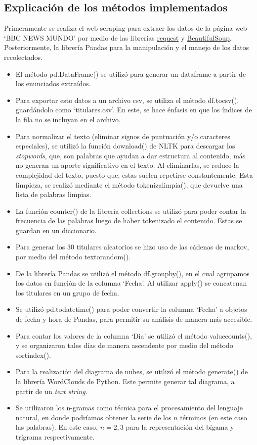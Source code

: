 \subsection{Explicación de los métodos implementados}
Primeramente se realiza el web scraping para extraer los datos de la página web ‘BBC NEWS MUNDO’ por medio de las librerías \underline{request} y \underline{BeautifulSoup}. Posteriormente, la librería Pandas para la manipulación y el manejo de los datos recolectados. 
\begin{itemize}
    \item El método pd.DataFrame() se utilizó para generar un dataframe a partir de los enunciados extraídos.  
    \item Para exportar esto datos a un archivo csv, se utiliza el método df.to\textunderscore csv(), guardándolo como ‘titulares.csv’. En este, se hace énfasis en que los índices de la fila no se incluyan en el archivo. 
    \item Para normalizar el texto (eliminar signos de puntuación y/o caracteres especiales), se utilizó la función download() de     NLTK para descargar los \textit{stopwords}, que, son palabras que ayudan a dar estructura al contenido, más no generan un aporte significativo en el texto. Al eliminarlas, se reduce la complejidad del texto, puesto que, estas suelen repetirse constantemente. Esta limpieza, se realizó mediante el método tokeniza\textunderscore limpia(), que devuelve una lista de palabras limpias.
    \item La función counter() de la librería collections se utilizó para poder contar la frecuencia de las palabras luego de haber tokenizado el contenido. Estas se guardan en un diccionario. 
    \item Para generar los 30 titulares aleatorios se hizo uso de las cádenas de markov, por medio del método texto\textunderscore random().
    \item De la librería Pandas se utilizó el método df.groupby(), en el cual agrupamos los datos en función de la columna ‘Fecha’. Al utilizar apply() se concatenan los titulares en un grupo de fecha. 
    \item Se utilizó pd.to\textunderscore datetime() para poder convertir la columna ‘Fecha’ a objetos de fecha y hora de Pandas, para permitir su análisis de manera más accesible. 
    \item Para contar los valores de la columna ‘Dia’ se utilizó el método value\textunderscore counts(), y se organizaron tales días de manera ascendente por medio del método sort\textunderscore index().
    \item Para la realización del diagrama de nubes, se utilizó el método generate() de la librería WordClouds de Python. Este permite generar tal diagrama, a partir de un \textit{text string}.
    \item Se utilizaron los n-gramas como técnica para el procesamiento del lenguaje natural, en donde podríamos obtener la serie de los $n$ términos (en este caso las palabras). En este caso, $n=2,3$ para la representación del bígama y trígrama respectivamente. 
\end{itemize}


